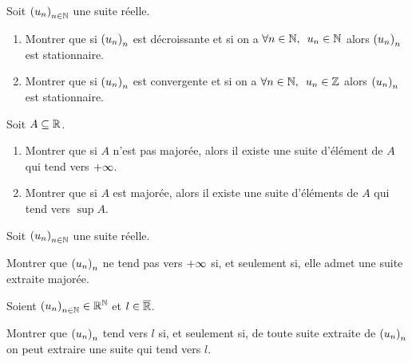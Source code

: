 \begin{exo}
Soit \(\left(u_n\right)_{n\in\mathbb{N}}\) une suite réelle.

\begin{enumerate}
\item Montrer que si \(\left(u_n\right)_n\) est décroissante et si on a \(\quantifs{\forall n\in\N}u_n\in\N\) alors \(\left(u_n\right)_n\) est stationnaire. \\

\item Montrer que si \(\left(u_n\right)_n\) est convergente et si on a \(\quantifs{\forall n\in\N}u_n\in\Z\) alors \(\left(u_n\right)_n\) est stationnaire.
\end{enumerate}
\end{exo}

\begin{corr}
\end{corr}

\begin{exo}
Soit \(A\subseteq\mathbb{R}\).

\begin{enumerate}
\item Montrer que si \(A\) n'est pas majorée, alors il existe une suite d'élément de \(A\) qui tend vers \(+\infty\). \\

\item Montrer que si \(A\) est majorée, alors il existe une suite d'éléments de \(A\) qui tend vers \(\sup A\).
\end{enumerate}
\end{exo}

\begin{corr}
\end{corr}

\begin{exo}
Soit \(\left(u_n\right)_{n\in\mathbb{N}}\) une suite réelle.

Montrer que \(\left(u_n\right)_n\) ne tend pas vers \(+\infty\) si, et seulement si, elle admet une suite extraite majorée.
\end{exo}

\begin{corr}
\end{corr}

\begin{exo}
Soient \(\left(u_n\right)_{n\in\mathbb{N}}\in\mathbb{R}^{\mathbb{N}}\) et \(l\in\overline{\mathbb{R}}\).

Montrer que \(\left(u_n\right)_n\) tend vers \(l\) si, et seulement si, de toute suite extraite de \(\left(u_n\right)_n\) on peut extraire une suite qui tend vers \(l\).
\end{exo}


